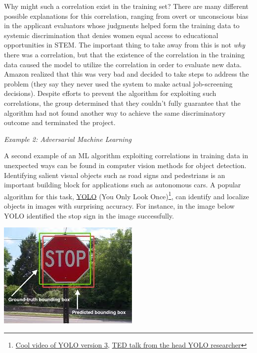 \documentclass[assignment01_Solutions]{subfiles}
\begin{document}
Why might such a correlation exist in the training set?  There are many different possible explanations for this correlation, ranging from overt or unconscious bias in the applicant evaluators whose judgments helped form the training data to systemic discrimination that denies women equal access to educational opportunities in STEM.  The important thing to take away from this is not \emph{why} there was a correlation, but that the existence of the correlation in the training data caused the model to utilize the correlation in order to evaluate new data.  Amazon realized that this was very bad and decided to take steps to address the problem (they say they never used the system to make actual job-screening decisions).  Despite efforts to prevent the algorithm for exploiting such correlations, the group determined that they couldn't fully guarantee that the algorithm had not found another way to achieve the same discriminatory outcome and terminated the project.


\item \emph{Example 2: Adversarial Machine Learning}

A second example of an ML algorithm exploiting correlations in training data in unexpected ways can be found in computer vision methods for object detection.  Identifying salient visual objects such as road signs and pedestrians is an important building block for applications such as autonomous cars.  A popular algorithm for this task, \href{https://pjreddie.com/darknet/yolo/}{YOLO} (You Only Look Once)\footnote{\href{https://www.youtube.com/watch?time_continue=77&v=MPU2HistivI}{Cool video of YOLO version 3}, \href{https://www.youtube.com/watch?v=Cgxsv1riJhI}{TED talk from the head YOLO researcher}}, can identify and localize objects in images with surprising accuracy.  For instance, in the image below YOLO identified the stop sign in the image successfully.
\begin{center}
\includegraphics[width=0.6\linewidth]{figures/stopsignyolo}
\end{center}
\end{document}
